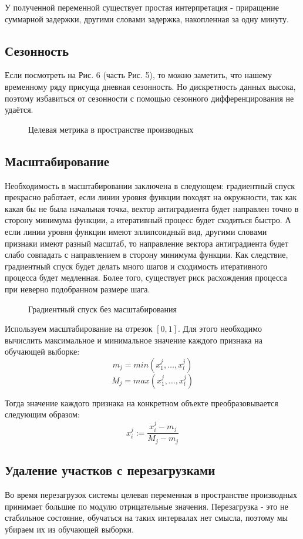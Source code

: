 \documentclass[14pt, a4paper]{extarticle}
\begin{document}
	У полученной переменной существует простая интерпретация - приращение суммарной задержки, другими словами задержка, накопленная за одну минуту.
	
	\subsection{Сезонность}
	  Если посмотреть на Рис. 6 (часть Рис. 5), то можно заметить, что нашему временному ряду присуща дневная сезонность. Но дискретность данных высока, поэтому избавиться от сезонности с помощью сезонного дифференцирования не удаётся. 
	 
	 \begin{figure}[H]
		\centerline{} 
		\caption{Целевая метрика в пространстве производных}
		\label{target_metric_fig1}
	\end{figure} 	
	
	\subsection{Масштабирование}	
	Необходимость в масштабировании заключена в следующем: градиентный спуск прекрасно работает, если линии уровня функции походят на окружности, так как какая бы не была начальная точка, вектор антиградиента будет направлен точно в сторону минимума функции, а итеративный процесс будет сходиться быстро. А если линии уровня функции имеют эллипсоидный вид, другими словами признаки имеют разный масштаб, то направление вектора антиградиента будет слабо совпадать с направлением в сторону минимума функции. Как следствие, градиентный спуск будет делать много шагов и  сходимость итеративного процесса будет медленная. Более того, существует риск расхождения процесса при неверно подобранном размере шага.
	\begin{figure}[H]
		\centerline{} 
		\caption{Градиентный спуск без масштабирования}
		\label{target_metric_fig1}
	\end{figure} 	
	 
	 Используем масштабирование на отрезок $[0, 1]$. Для этого необходимо вычислить максимальное и минимальное значение каждого признака на обучающей выборке:
	  $$m_j = min(x_1^j, \dots, x_l^j)$$
	  $$M_j = max(x_1^j, \dots, x_l^j)$$
	 
	 Тогда значение каждого признака на конкретном объекте преобразовывается следующим образом:
	 $$x_i^j := \dfrac{x_i^j - m_j}{M_j-m_j}$$
	\subsection{Удаление участков с перезагрузками}	
	Во время перезагрузок системы целевая переменная в пространстве производных принимает большие по модулю отрицательные значения. Перезагрузка - это не стабильное состояние, обучаться на таких интервалах нет смысла, поэтому мы убираем их из обучающей выборки.	
\end{document}
